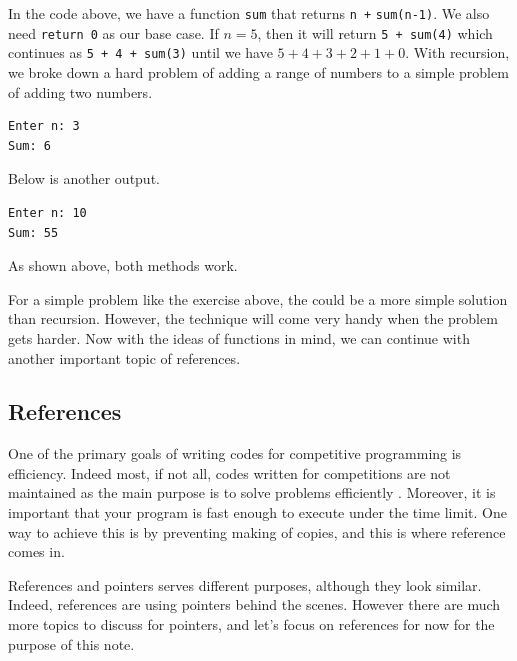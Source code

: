 \documentclass[../../main.tex]{subfiles}
\begin{document}
\begin{solution}
In the code above, we have a function \verb|sum| that returns
\verb|n +| \newline \verb|sum(n-1)|. We also need \verb|return 0|
as our base case. If $n = 5$, then it will return \verb|5 + sum(4)|
which continues as \verb|5 + 4 + sum(3)| until we have $5 + 4 + 3 +
2 + 1 + 0$. With recursion, we broke down a hard problem of adding
a range of numbers to a simple problem of adding two numbers.

\begin{outputboxSolution}
\begin{lstlisting}[style=basic]
Enter n: 3
Sum: 6
\end{lstlisting}
\end{outputboxSolution}

Below is another output.

\begin{outputboxSolution}
\begin{lstlisting}[style=basic]
Enter n: 10
Sum: 55
\end{lstlisting}
\end{outputboxSolution}

As shown above, both methods work.
\end{solution}

For a simple problem like the exercise above, the could be a more
simple solution than recursion. However, the technique will come
very handy when the problem gets harder. Now with the ideas of
functions in mind, we can continue with another important topic of
references.

\subsection{References}

One of the primary goals of writing codes for competitive programming
is efficiency. Indeed most, if not all, codes written for competitions
are not maintained as the main purpose is to solve problems
efficiently \cite{CS02-3}. Moreover, it is important that your
program is fast enough to execute under the time limit. One way to
achieve this is by preventing making of copies, and this is where
reference comes in.

References and pointers serves different purposes, although they look
similar. Indeed, references are using pointers behind the scenes.
However there are much more topics to discuss for pointers, and let's
focus on references for now for the purpose of this note.
\end{document}
